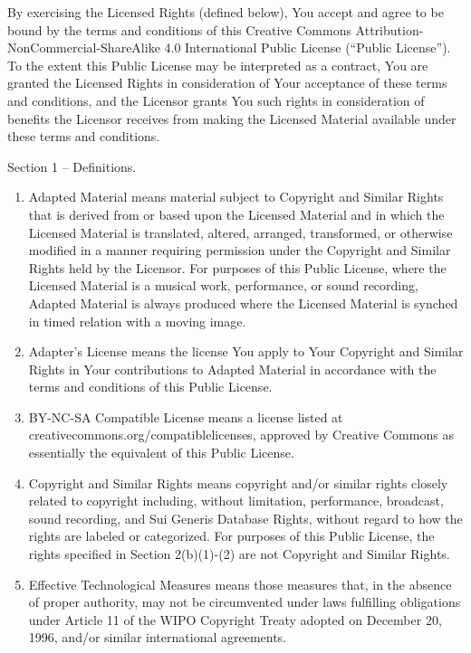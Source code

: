 \documentclass[]{scrbook}
\begin{document}
By exercising the Licensed Rights (defined below), You accept and agree
to be bound by the terms and conditions of this Creative Commons
Attribution-NonCommercial-ShareAlike 4.0 International Public License
(``Public License''). To the extent this Public License may be
interpreted as a contract, You are granted the Licensed Rights in
consideration of Your acceptance of these terms and conditions, and the
Licensor grants You such rights in consideration of benefits the
Licensor receives from making the Licensed Material available under
these terms and conditions.

Section 1 -- Definitions.

\begin{enumerate}
\def\labelenumi{\alph{enumi}.}
\item
  Adapted Material means material subject to Copyright and Similar
  Rights that is derived from or based upon the Licensed Material and in
  which the Licensed Material is translated, altered, arranged,
  transformed, or otherwise modified in a manner requiring permission
  under the Copyright and Similar Rights held by the Licensor. For
  purposes of this Public License, where the Licensed Material is a
  musical work, performance, or sound recording, Adapted Material is
  always produced where the Licensed Material is synched in timed
  relation with a moving image.
\item
  Adapter's License means the license You apply to Your Copyright and
  Similar Rights in Your contributions to Adapted Material in accordance
  with the terms and conditions of this Public License.
\item
  BY-NC-SA Compatible License means a license listed at
  creativecommons.org/compatiblelicenses, approved by Creative Commons
  as essentially the equivalent of this Public License.
\item
  Copyright and Similar Rights means copyright and/or similar rights
  closely related to copyright including, without limitation,
  performance, broadcast, sound recording, and Sui Generis Database
  Rights, without regard to how the rights are labeled or categorized.
  For purposes of this Public License, the rights specified in Section
  2(b)(1)-(2) are not Copyright and Similar Rights.
\item
  Effective Technological Measures means those measures that, in the
  absence of proper authority, may not be circumvented under laws
  fulfilling obligations under Article 11 of the WIPO Copyright Treaty
  adopted on December 20, 1996, and/or similar international agreements.

\end{enumerate}
\end{document}
